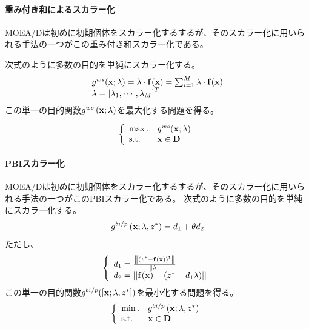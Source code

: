 \documentclass{rentai-chugoku}
\begin{document}
\paragraph{重み付き和によるスカラー化}
MOEA/Dは初めに初期個体をスカラー化するするが、そのスカラー化に用いられる手法の一つがこの重み付き和スカラー化である。

次式のように多数の目的を単純にスカラー化する。
\begin{equation}
\begin{array}{ll}
g^{ws}({\bf x}; \lambda)=\lambda \cdot {\bf f}({\bf x})=\sum_{i=1}^{M} \lambda \cdot {\bf f({\bf x})}
\\
\lambda=\left[ \lambda_1, \cdots, \lambda_M \right]^T
\end{array}
\end{equation}
この単一の目的関数$g^{ws}\left({\bf x}; \lambda \right)$を最大化する問題を得る。

\begin{equation}
\left\{
\begin{array}{ll}
\max.& g^{ws}({\bf x}; \lambda)
\\
{\rm s.t.}& {\bf x} \in {\bf D}
\end{array}
\right.
\end{equation}
\paragraph{PBIスカラー化}
MOEA/Dは初めに初期個体をスカラー化するするが、そのスカラー化に用いられる手法の一つがこのPBIスカラー化である。
次式のように多数の目的を単純にスカラー化する。
\begin{equation}
g^{bi/p}\left({\bf x};\lambda,z^* \right)=d_1+\theta d_2
\end{equation}
ただし、
\begin{equation}
\left\{
\begin{array}{ll}
d_1=\frac{\left\|\left(z^*-{\bf f}(\bf x)\right)^t\right\|}{\|\lambda\|}
\\
d_2=||{\bf f}({\bf x})-(z^*-d_1\lambda)||
\end{array}
\right.
\end{equation}
この単一の目的関数$g^{bi/p}(\left[{\bf x};\lambda,z^*\right])$を最小化する問題を得る。
\begin{equation}
\left\{
\begin{array}{ll}
\min.& g^{bi/p}\left({\bf x};\lambda,z^*\right)
\\
{\rm s.t.}& {\bf x} \in {\bf D}
\end{array}
\right.
\end{equation}
\end{document}
